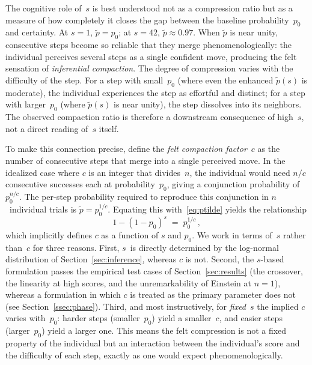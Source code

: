 \documentclass{article}
\begin{document}
The cognitive role of~$s$ is best understood not as a compression ratio
but as a measure of how completely it closes the gap between the
baseline probability~$p_0$ and certainty. At $s = 1$,
$\widetilde{p} = p_0$; at $s = 42$, $\widetilde{p} \approx 0.97$. When
$\widetilde{p}$ is near unity, consecutive steps become so reliable that
they merge phenomenologically: the individual perceives several steps as
a single confident move, producing the felt sensation of \emph{inferential
compaction}. The degree of compression varies with the difficulty of the
step. For a step with small~$p_0$ (where even the enhanced
$\widetilde{p}(s)$ is moderate), the individual experiences the step as
effortful and distinct; for a step with larger~$p_0$ (where
$\widetilde{p}(s)$ is near unity), the step dissolves into its neighbors.
The observed compaction ratio is therefore a downstream consequence of
high~$s$, not a direct reading of~$s$ itself.

To make this connection precise, define the \emph{felt compaction
factor}~$c$ as the number of consecutive steps that merge into a single
perceived move. In the idealized case where $c$ is an integer that
divides~$n$, the individual would need $n/c$ consecutive successes each
at probability~$p_0$, giving a conjunction probability of $p_0^{n/c}$.
The per-step probability required to reproduce this conjunction in
$n$~individual trials is $\widetilde{p} = p_0^{1/c}$. Equating this
with~\eqref{eq:ptilde} yields the relationship
\begin{equation}\label{eq:c-from-s}
  1 - (1-p_0)^s \;=\; p_0^{1/c}\,,
\end{equation}
which implicitly defines $c$ as a function of $s$ and $p_0$. We work in
terms of~$s$ rather than~$c$ for three reasons. First, $s$~is directly
determined by the log-normal distribution of
Section~\ref{sec:inference}, whereas $c$ is not. Second, the
$s$-based formulation passes the empirical test cases of
Section~\ref{sec:results} (the crossover, the linearity at high
scores, and the unremarkability of Einstein at $n = 1$), whereas a
formulation in which $c$ is treated as the primary parameter does not
(see Section~\ref{ssec:phase}). Third, and most instructively, for
\emph{fixed}~$s$ the implied $c$ varies with~$p_0$: harder steps
(smaller~$p_0$) yield a smaller~$c$, and easier steps (larger~$p_0$)
yield a larger one. This means the felt compression is not a fixed
property of the individual but an interaction between the individual's
score and the difficulty of each step, exactly as one would expect
phenomenologically.
\end{document}
